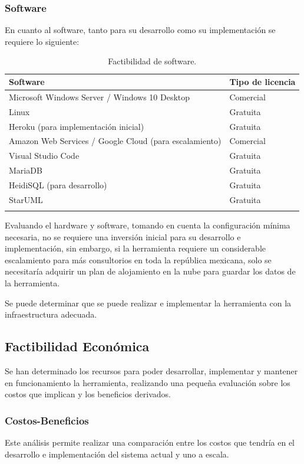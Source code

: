 \subsubsection{Software}
\noindent
En cuanto al software, tanto para su desarrollo como su implementación se requiere lo siguiente:

\begin{longtable}[c]{|p{13cm}|p{3.5cm}|}
\hline\textbf{Software} & \textbf{Tipo de licencia} \\ \hline
Microsoft Windows Server / Windows 10 Desktop
& Comercial\\ \hline
Linux
& Gratuita\\ \hline
Heroku (para implementación inicial)
& Gratuita\\ \hline
Amazon Web Services / Google Cloud (para escalamiento)
& Comercial\\ \hline
Visual Studio Code
& Gratuita\\ \hline
MariaDB
& Gratuita\\ \hline
HeidiSQL (para desarrollo)
& Gratuita\\ \hline
StarUML
& Gratuita\\ \hline
\caption{Factibilidad de software.}
\label{table:1}
\end{longtable}

\noindent
Evaluando el hardware y software, tomando en cuenta la configuración mínima necesaria, no se requiere una inversión inicial para su desarrollo e implementación, sin embargo, si la herramienta requiere un considerable escalamiento para más consultorios en toda la república mexicana, solo se necesitaría adquirir un plan de alojamiento en la nube para guardar los datos de la herramienta.

\vspace{1em}

Se puede determinar que se puede realizar e implementar la herramienta con la infraestructura adecuada.


\subsection{Factibilidad Económica}
\noindent
Se han determinado los recursos para poder desarrollar, implementar y mantener en funcionamiento la herramienta, realizando una pequeña evaluación sobre los costos que implican y los beneficios derivados.

\subsubsection{Costos-Beneficios}
\noindent
Este análisis permite realizar una comparación entre los costos que tendría en el desarrollo e implementación del sistema actual y uno a escala.

